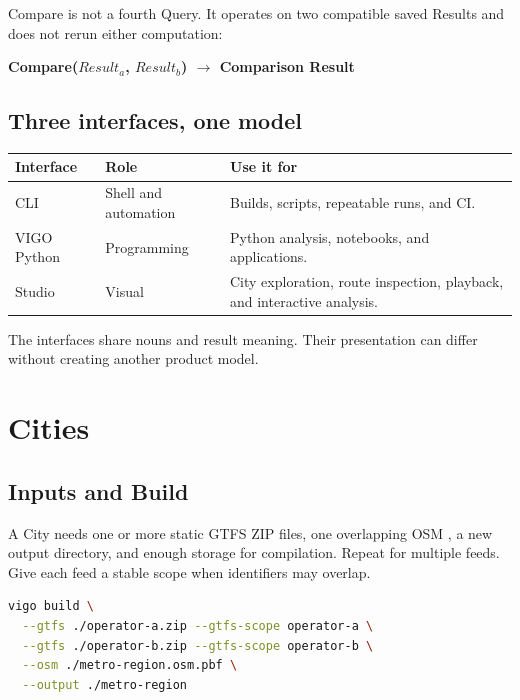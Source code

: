 \documentclass[10pt,letterpaper]{article}
\begin{document}
Compare is not a fourth Query. It operates on two compatible saved Results and does not rerun either computation:

\begin{center}
\sffamily\bfseries\color{VigoNavy}Compare($Result_a$, $Result_b$) $\longrightarrow$ Comparison Result
\end{center}

\subsection{Three interfaces, one model}

\begin{center}
\begin{tabularx}{\linewidth}{P{1.0in} P{2.0in} Y}
\toprule
\textbf{Interface} & \textbf{Role} & \textbf{Use it for} \\
\midrule
CLI & Shell and automation & Builds, scripts, repeatable runs, and CI. \\
VIGO Python & Programming & Python analysis, notebooks, and applications. \\
Studio & Visual & City exploration, route inspection, playback, and interactive analysis. \\
\bottomrule
\end{tabularx}
\end{center}

The interfaces share nouns and result meaning. Their presentation can differ without creating another product model.

\section{Cities}

\subsection{Inputs and Build}

A City needs one or more static GTFS ZIP files, one overlapping OSM , a new output directory, and enough storage for compilation. Repeat  for multiple feeds. Give each feed a stable scope when identifiers may overlap.

\begin{lstlisting}[language=bash]
vigo build \
  --gtfs ./operator-a.zip --gtfs-scope operator-a \
  --gtfs ./operator-b.zip --gtfs-scope operator-b \
  --osm ./metro-region.osm.pbf \
  --output ./metro-region
\end{lstlisting}
\end{document}
